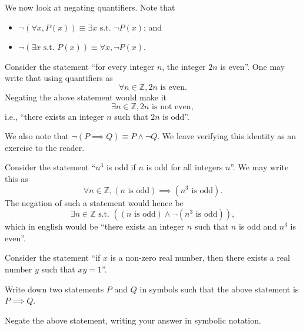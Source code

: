 \newpage

We now look at negating quantifiers. Note that
\begin{itemize}
    \item $\lnot(\forall x, P(x)) \equiv \exists x \text{ s.t. } \lnot P(x)$; and
    \item $\lnot(\exists x \text{ s.t. } P(x)) \equiv \forall x, \lnot P(x)$.
\end{itemize}
\begin{example}
    Consider the statement ``for every integer $n$, the integer $2n$ is even''. One may write that using quantifiers as
    \[
        \forall n \in\mathbb{Z}, 2n \text{ is even}.
    \]
    Negating the above statement would make it
    \[
        \exists n \in \mathbb{Z}, 2n \text{ is not even},
    \]
    i.e., ``there exists an integer $n$ such that $2n$ is odd''.
\end{example}

We also note that $\lnot(P \implies Q) \equiv P \land \lnot Q$. We leave verifying this identity as an exercise to the reader.

\begin{example}
    Consider the statement ``$n^3$ is odd if $n$ is odd for all integers $n$''. We may write this as
    \[
        \forall n \in \mathbb{Z}, (n \text{ is odd}) \implies (n^3 \text{ is odd}).
    \]
    The negation of such a statement would hence be
    \[
        \exists n \in \mathbb{Z} \text{ s.t. }((n \text{ is odd}) \land \lnot(n^3 \text{ is odd})),
    \]
    which in english would be ``there exists an integer $n$ such that $n$ is odd and $n^3$ is even''.
\end{example}

\begin{exercise}
    Consider the statement ``if $x$ is a non-zero real number, then there exists a real number $y$ such that $xy = 1$''.
    \begin{partquestions}{\roman*}
        \item Write down two statements $P$ and $Q$ in symbols such that the above statement is $P \implies Q$.
        \item Negate the above statement, writing your answer in symbolic notation.
    \end{partquestions}
\end{exercise}

